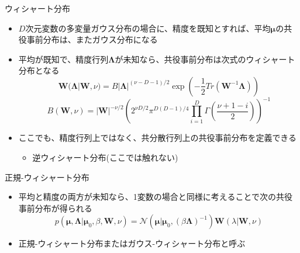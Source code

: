   \begin{frame}{ウィシャート分布}
   \begin{itemize}
    \item $D$次元変数の多変量ガウス分布の場合に、\alert{精度を既知}とすれば、平均$\bm{\mu}$の共役事前分布は、またガウス分布になる
    \item \alert{平均が既知}で、精度行列$\bm{\Lambda}$が未知なら、共役事前分布は次式のウィシャート分布となる
          \begin{equation}
           \bm{W}(\bm{\Lambda}|\bm{W},\nu) = B|\bm{\Lambda}|^{(\nu-D-1)/2}\exp\left(-\frac{1}{2}Tr(\bm{W}^{-1}\bm{\Lambda})\right)
          \end{equation}
          \begin{equation}
           B(\bm{W},\nu) = |\bm{W}|^{-\nu/2}\left(2^{\nu D/2}\pi^{D(D-1)/4}\prod_{i=1}^D\Gamma\left(\frac{\nu+1-i}{2}\right)\right)^{-1}
          \end{equation}
    \item ここでも、精度行列上ではなく、共分散行列上の共役事前分布を定義できる
          \begin{itemize}
           \item 逆ウィシャート分布(ここでは触れない)
          \end{itemize}
   \end{itemize}
  \end{frame}

  \begin{frame}{正規-ウィシャート分布}
   \begin{itemize}
    \item \alert{平均と精度の両方が未知}なら、1変数の場合と同様に考えることで次の共役事前分布が得られる
          \begin{equation}
           p(\bm{\mu},\bm{\Lambda}|\bm{\mu}_0,\beta,\bm{W},\nu) = \mathcal{N}(\bm{\mu}|\bm{\mu}_0,(\beta\bm{\Lambda})^{-1})\bm{W}(\lambda|\bm{W},\nu)
          \end{equation}
    \item \alert{正規-ウィシャート分布}または\alert{ガウス-ウィシャート分布}と呼ぶ
   \end{itemize}
  \end{frame}
